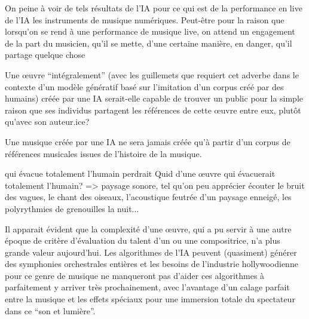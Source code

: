 On peine à voir de tels résultats de l'IA pour ce qui est de la performance en live de l'IA les instruments de musique numériques.
Peut-être pour la raison que lorsqu'on se rend à une performance de musique live, on attend un engagement de la part du musicien, qu'il se mette, d'une certaine manière, en danger, qu'il partage quelque chose




Une œuvre ``intégralement'' (avec les guillemets que requiert cet adverbe dans le contexte d'un modèle génératif basé sur l'imitation d'un corpus créé par des humains) créée par une IA serait-elle capable de trouver un public pour la simple raison que ses individus partagent les références de cette œuvre entre eux, plutôt qu'avec son auteur.ice?

Une musique créée par une IA ne sera jamais créée qu'à partir d'un corpus de références musicales issues de l'histoire de la musique.

qui évacue totalement l'humain perdrait 
Quid d'une œuvre qui évacuerait totalement l'humain?
=> paysage sonore, tel qu'on peu apprécier écouter le bruit des vagues, le chant des oiseaux, l'acoustique feutrée d'un paysage enneigé, les polyrythmies de grenouilles la nuit...


Il apparait évident que la complexité d'une œuvre, qui a pu servir à une autre époque de critère d'évaluation du talent d'un ou une compositrice, n'a plus grande valeur aujourd'hui. Les algorithmes de l'IA peuvent (quasiment) générer des symphonies orchestrales entières et les besoins de l'industrie hollywoodienne pour ce genre de musique ne manqueront pas d'aider ces algorithmes à parfaitement y arriver très prochainement, avec l'avantage d'un calage parfait entre la musique et les effets spéciaux pour une immersion totale du spectateur dans ce ``son et lumière''.

